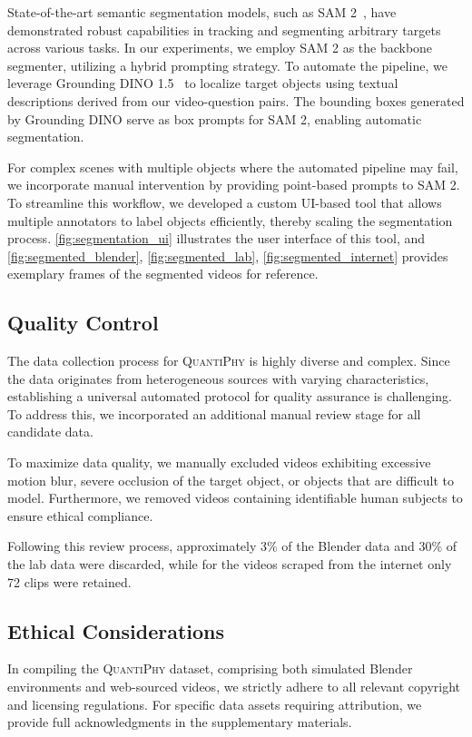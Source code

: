 State-of-the-art semantic segmentation models, such as SAM 2~\cite{ravi2024sam2}, have demonstrated robust capabilities in tracking and segmenting arbitrary targets across various tasks. In our experiments, we employ SAM 2 as the backbone segmenter, utilizing a hybrid prompting strategy. To automate the pipeline, we leverage Grounding DINO 1.5~\cite{ren2024grounding} to localize target objects using textual descriptions derived from our video-question pairs. The bounding boxes generated by Grounding DINO serve as box prompts for SAM 2, enabling automatic segmentation.

For complex scenes with multiple objects where the automated pipeline may fail, we incorporate manual intervention by providing point-based prompts to SAM 2. To streamline this workflow, we developed a custom UI-based tool that allows multiple annotators to label objects efficiently, thereby scaling the segmentation process. \autoref{fig:segmentation_ui} illustrates the user interface of this tool, and \autoref{fig:segmented_blender}, \autoref{fig:segmented_lab}, \autoref{fig:segmented_internet} provides exemplary frames of the segmented videos for reference.

\subsection{Quality Control}

The data collection process for \textsc{QuantiPhy} is highly diverse and complex. Since the data originates from heterogeneous sources with varying characteristics, establishing a universal automated protocol for quality assurance is challenging. To address this, we incorporated an additional manual review stage for all candidate data.

To maximize data quality, we manually excluded videos exhibiting excessive motion blur, severe occlusion of the target object, or objects that are difficult to model. Furthermore, we removed videos containing identifiable human subjects to ensure ethical compliance.

Following this review process, approximately 3\% of the Blender data and 30\% of the lab data were discarded, while for the videos scraped from the internet only 72 clips were retained.

\subsection{Ethical Considerations}
In compiling the \textsc{QuantiPhy} dataset, comprising both simulated Blender environments and web-sourced videos, we strictly adhere to all relevant copyright and licensing regulations. For specific data assets requiring attribution, we provide full acknowledgments in the supplementary materials.

